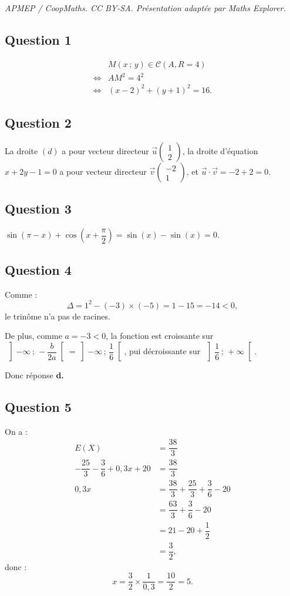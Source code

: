 \documentclass[10pt]{article}
\begin{document}
\noindent\textit{APMEP / CoopMaths. CC BY-SA. Présentation adaptée par Maths Explorer.}\par\medskip
\subsection*{Question 1}

\begin{align*}
&M(x\,;\,y) \in \mathcal{C} (A, R = 4) \\
\iff &AM^2 = 4^2 \\
\iff &(x - 2)^2 + (y + 1)^2 = 16.
\end{align*}

\subsection*{Question 2}

La droite \((d)\) a pour vecteur directeur \( \vec{u} \begin{pmatrix} 1 \\ 2 \end{pmatrix} \), la droite d'équation \( x + 2y - 1 = 0 \) a pour vecteur directeur \( \vec{v} \begin{pmatrix} -2 \\ 1 \end{pmatrix} \), et \(\vec{u} \cdot \vec{v} = -2 + 2 = 0\).

\subsection*{Question 3}

\(\sin(\pi - x) + \cos\left(x + \dfrac{\pi}{2}\right) = \sin(x) - \sin(x) = 0\).

\subsection*{Question 4}

Comme :
\[
\Delta = 1^2 - (-3) \times (-5) = 1 - 15 = -14 < 0,
\]
le trinôme n'a pas de racines.

De plus, comme \(a = -3 < 0\), la fonction est croissante sur \(\, \left] -\infty \,;\, -\dfrac{b}{2a} \right[ = \left] -\infty \,;\, \dfrac{1}{6} \right[\), pui décroissante sur \(\, \left] \dfrac{1}{6} \,;\, +\infty \right[\).

Donc réponse \textbf{d.}

\subsection*{Question 5}

On a :
\begin{align*}
E(X) &= \dfrac{38}{3} \\
-\dfrac{25}{3} - \dfrac{3}{6} + 0,3x + 20 &= \dfrac{38}{3} \\
0,3x &= \dfrac{38}{3} + \dfrac{25}{3} + \dfrac{3}{6} - 20 \\
&= \dfrac{63}{3} + \dfrac{3}{6} - 20 \\
&= 21 - 20 + \dfrac{1}{2} \\
&= \dfrac{3}{2},
\end{align*}
donc :
\[
x = \dfrac{3}{2} \times \dfrac{1}{0,3} = \dfrac{10}{2} = 5.
\]
\end{document}
